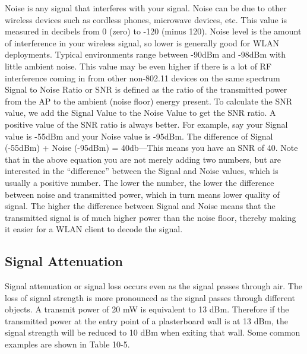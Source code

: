 Noise is any signal that interferes with your signal.
Noise can be due to other wireless devices such as cordless phones,
	microwave devices,
	etc.
This value is measured in decibels from 0 (zero) to -120 (minus 120).
Noise level is the amount of interference in your wireless signal,
	so lower is generally good for WLAN deployments.
Typical environments range between -90dBm and -98dBm with little ambient noise.
This value may be even higher if there is a lot of RF interference coming in from other non-802.11 devices on the same spectrum Signal to Noise Ratio or SNR is defined as the ratio of the transmitted power from the AP to the ambient (noise floor) energy present.
To calculate the SNR value,
	we add the Signal Value to the Noise Value to get the SNR ratio.
A positive value of the SNR ratio is always better.
For example,
	say your Signal value is -55dBm and your Noise value is -95dBm.
The difference of Signal (-55dBm) + Noise (-95dBm) = 40db—This means you have an SNR of 40.
Note that in the above equation you are not merely adding two numbers,
	but are interested in the “difference” between the Signal and Noise values,
	which is usually a positive number.
The lower the number,
	the lower the difference between noise and transmitted power,
	which in turn means lower quality of signal.
The higher the difference between Signal and Noise means that the transmitted signal is of much higher power than the noise floor,
	thereby making it easier for a WLAN client to decode the signal.


\subsection{Signal Attenuation}

Signal attenuation or signal loss occurs even as the signal passes through air.
The loss of signal strength is more pronounced as the signal passes through different objects.
A transmit power of 20 mW is equivalent to 13 dBm.
Therefore if the transmitted power at the entry point of a plasterboard wall is at 13 dBm,
	the signal strength will be reduced to 10 dBm when exiting that wall.
Some common examples are shown in Table 10-5.
